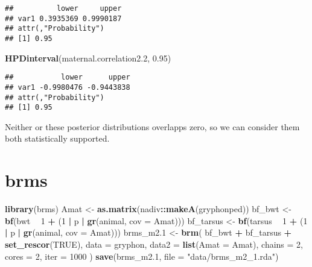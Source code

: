 \documentclass[12pt,]{book}
\newenvironment{Shaded}{\begin{snugshade}}{\end{snugshade}}
\newcommand{\DataTypeTok}[1]{\textcolor[rgb]{0.13,0.29,0.53}{#1}}
\newcommand{\DecValTok}[1]{\textcolor[rgb]{0.00,0.00,0.81}{#1}}
\newcommand{\FloatTok}[1]{\textcolor[rgb]{0.00,0.00,0.81}{#1}}
\newcommand{\KeywordTok}[1]{\textcolor[rgb]{0.13,0.29,0.53}{\textbf{#1}}}
\newcommand{\NormalTok}[1]{#1}
\newcommand{\OperatorTok}[1]{\textcolor[rgb]{0.81,0.36,0.00}{\textbf{#1}}}
\newcommand{\OtherTok}[1]{\textcolor[rgb]{0.56,0.35,0.01}{#1}}
\newcommand{\StringTok}[1]{\textcolor[rgb]{0.31,0.60,0.02}{#1}}
\begin{document}
\begin{verbatim}
##          lower     upper
## var1 0.3935369 0.9990187
## attr(,"Probability")
## [1] 0.95
\end{verbatim}

\begin{Shaded}
\begin{Highlighting}[]
\KeywordTok{HPDinterval}\NormalTok{(maternal.correlation2}\FloatTok{.2}\NormalTok{, }\FloatTok{0.95}\NormalTok{)}
\end{Highlighting}
\end{Shaded}

\begin{verbatim}
##           lower      upper
## var1 -0.9980476 -0.9443838
## attr(,"Probability")
## [1] 0.95
\end{verbatim}

Neither or these posterior distributions overlapps zero, so we can consider them both statistically supported.

\hypertarget{brms-2}{%
\section{brms}\label{brms-2}}

\begin{Shaded}
\begin{Highlighting}[]
\KeywordTok{library}\NormalTok{(brms)}
\NormalTok{Amat <-}\StringTok{ }\KeywordTok{as.matrix}\NormalTok{(nadiv}\OperatorTok{::}\KeywordTok{makeA}\NormalTok{(gryphonped))}
\NormalTok{bf_bwt <-}\StringTok{ }\KeywordTok{bf}\NormalTok{(bwt }\OperatorTok{~}\StringTok{ }\DecValTok{1} \OperatorTok{+}\StringTok{ }\NormalTok{(}\DecValTok{1} \OperatorTok{|}\StringTok{ }\NormalTok{p }\OperatorTok{|}\StringTok{ }\KeywordTok{gr}\NormalTok{(animal, }\DataTypeTok{cov =}\NormalTok{ Amat)))}
\NormalTok{bf_tarsus <-}\StringTok{ }\KeywordTok{bf}\NormalTok{(tarsus }\OperatorTok{~}\StringTok{ }\DecValTok{1} \OperatorTok{+}\StringTok{ }\NormalTok{(}\DecValTok{1} \OperatorTok{|}\StringTok{ }\NormalTok{p }\OperatorTok{|}\StringTok{ }\KeywordTok{gr}\NormalTok{(animal, }\DataTypeTok{cov =}\NormalTok{ Amat)))}
\NormalTok{brms_m2}\FloatTok{.1}\NormalTok{ <-}\StringTok{ }\KeywordTok{brm}\NormalTok{(}
\NormalTok{  bf_bwt }\OperatorTok{+}\StringTok{ }\NormalTok{bf_tarsus }\OperatorTok{+}\StringTok{ }\KeywordTok{set_rescor}\NormalTok{(}\OtherTok{TRUE}\NormalTok{),}
  \DataTypeTok{data =}\NormalTok{ gryphon,}
  \DataTypeTok{data2 =} \KeywordTok{list}\NormalTok{(}\DataTypeTok{Amat =}\NormalTok{ Amat),}
  \DataTypeTok{chains =} \DecValTok{2}\NormalTok{, }\DataTypeTok{cores =} \DecValTok{2}\NormalTok{, }\DataTypeTok{iter =} \DecValTok{1000}
\NormalTok{)}
\KeywordTok{save}\NormalTok{(brms_m2}\FloatTok{.1}\NormalTok{, }\DataTypeTok{file =} \StringTok{"data/brms_m2_1.rda"}\NormalTok{)}
\end{Highlighting}
\end{Shaded}
\end{document}
